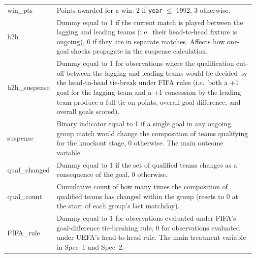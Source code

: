 \documentclass[11pt,a4paper]{article}
\begin{document}
\begin{longtable}{p{4.5cm} p{10.5cm}}
win\_pts &
Points awarded for a win: 2 if \texttt{year} $\leq$ 1992, 3 otherwise. \\

h2h &
Dummy equal to 1 if the current match is played between the lagging and leading teams (i.e.\ their head-to-head fixture is ongoing), 0 if they are in separate matches. Affects how one-goal shocks propagate in the suspense calculation. \\

h2h\_suspense &
Dummy equal to 1 for observations where the qualification cut-off between the lagging and leading teams would be decided by the head-to-head tie-break under FIFA rules (i.e.\ both a +1 goal for the lagging team and a +1 concession by the leading team produce a full tie on points, overall goal difference, and overall goals scored). \\

suspense &
Binary indicator equal to 1 if a single goal in any ongoing group match would change the composition of teams qualifying for the knockout stage, 0 otherwise. The main outcome variable. \\

qual\_changed &
Dummy equal to 1 if the set of qualified teams changes as a consequence of the goal, 0 otherwise. \\

qual\_count &
Cumulative count of how many times the composition of qualified teams has changed within the group (resets to 0 at the start of each group's last matchday). \\

FIFA\_rule &
Dummy equal to 1 for observations evaluated under FIFA's goal-difference tie-breaking rule, 0 for observations evaluated under UEFA's head-to-head rule. The main treatment variable in Spec~1 and Spec~2. \\

\end{longtable}
\end{document}
